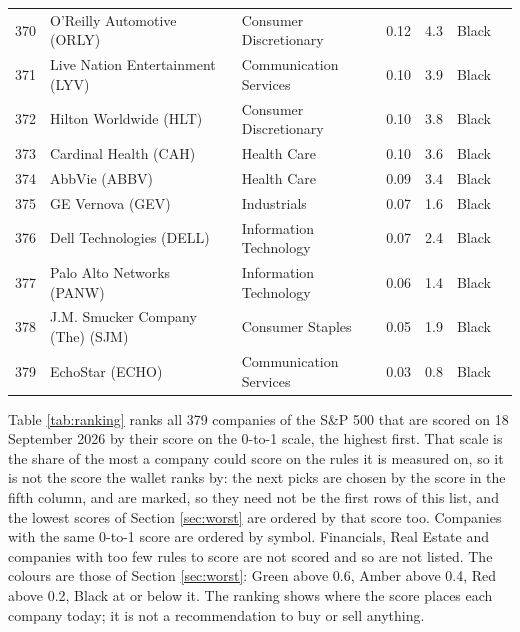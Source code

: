 \documentclass[11pt,a4paper]{article}
\begin{document}
{\begin{longtable}{r p{4.4cm} p{2.8cm} r r l l}
370 & O'Reilly Automotive (ORLY) & Consumer Discretionary & 0.12 & 4.3 & \cellcolor[HTML]{BFBFBF}Black &  \\
371 & Live Nation Entertainment (LYV) & Communication Services & 0.10 & 3.9 & \cellcolor[HTML]{BFBFBF}Black &  \\
372 & Hilton Worldwide (HLT) & Consumer Discretionary & 0.10 & 3.8 & \cellcolor[HTML]{BFBFBF}Black &  \\
373 & Cardinal Health (CAH) & Health Care & 0.10 & 3.6 & \cellcolor[HTML]{BFBFBF}Black &  \\
374 & AbbVie (ABBV) & Health Care & 0.09 & 3.4 & \cellcolor[HTML]{BFBFBF}Black &  \\
375 & GE Vernova (GEV) & Industrials & 0.07 & 1.6 & \cellcolor[HTML]{BFBFBF}Black &  \\
376 & Dell Technologies (DELL) & Information Technology & 0.07 & 2.4 & \cellcolor[HTML]{BFBFBF}Black &  \\
377 & Palo Alto Networks (PANW) & Information Technology & 0.06 & 1.4 & \cellcolor[HTML]{BFBFBF}Black &  \\
378 & J.M. Smucker Company (The) (SJM) & Consumer Staples & 0.05 & 1.9 & \cellcolor[HTML]{BFBFBF}Black &  \\
379 & EchoStar (ECHO) & Communication Services & 0.03 & 0.8 & \cellcolor[HTML]{BFBFBF}Black &  \\
\hline
\end{longtable}}
Table \ref{tab:ranking} ranks all 379 companies of the S\&P 500 that are scored on 18 September 2026 by their score on the 0-to-1 scale, the highest first. That scale is the share of the most a company could score on the rules it is measured on, so it is not the score the wallet ranks by: the next picks are chosen by the score in the fifth column, and are marked, so they need not be the first rows of this list, and the lowest scores of Section \ref{sec:worst} are ordered by that score too. Companies with the same 0-to-1 score are ordered by symbol. Financials, Real Estate and companies with too few rules to score are not scored and so are not listed. The colours are those of Section \ref{sec:worst}: Green above 0.6, Amber above 0.4, Red above 0.2, Black at or below it. The ranking shows where the score places each company today; it is not a recommendation to buy or sell anything.
\end{document}
